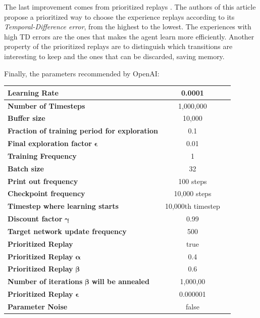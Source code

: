 \documentclass[11pt,twoside,a4paper]{article}
\begin{document}
The last improvement comes from prioritized replays
\cite{DBLP:journals/corr/SchaulQAS15}. The authors of this article propose a
prioritized way to choose the experience replays according to its
\emph{Temporal-Difference error}, from the highest to the lowest. The experiences
with high TD errors are the ones that makes the agent learn more efficiently.
Another property of the prioritized replays are to distinguish which transitions
are interesting to keep and the ones that can be discarded, saving memory.

Finally, the parameters recommended by OpenAI:

\begin{center}
  \begin{tabular}{ | l | c | r | }
    \hline
    \textbf{Learning Rate} & 0.0001 \\ \hline
    \textbf{Number of Timesteps} & 1,000,000 \\ \hline
    \textbf{Buffer size} & 10,000 \\ \hline
    \textbf{Fraction of training period for exploration} & 0.1 \\ \hline
    \textbf{Final exploration factor} $ \boldsymbol{\epsilon} $ & 0.01 \\ \hline
    \textbf{Training Frequency} & 1 \\ \hline
    \textbf{Batch size} & 32 \\ \hline
    \textbf{Print out frequency} & 100 steps \\ \hline
    \textbf{Checkpoint frequency} & 10,000 steps \\ \hline
    \textbf{Timestep where learning starts} & 10,000th timestep \\ \hline
    \textbf{Discount factor} $ \boldsymbol{\gamma} $ & 0.99 \\ \hline
    \textbf{Target network update frequency} & 500 \\ \hline
    \textbf{Prioritized Replay} & true \\ \hline
    \textbf{Prioritized Replay} $ \boldsymbol{\alpha} $ & 0.4 \\ \hline
    \textbf{Prioritized Replay} $ \boldsymbol{\beta} $ & 0.6 \\ \hline
    \textbf{Number of iterations} $ \boldsymbol{\beta} $ \textbf{will be annealed} & 1,000,00 \\ \hline
    \textbf{Prioritized Replay} $ \boldsymbol{\epsilon} $ & 0.000001 \\ \hline
    \textbf{Parameter Noise} & false \\
    \hline
  \end{tabular}
\end{center}
\end{document}
